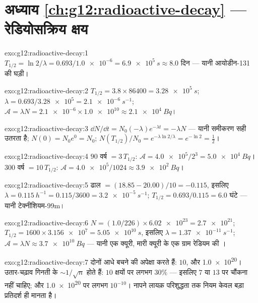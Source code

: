 \section*{अध्याय \ref{ch:g12:radioactive-decay} --- रेडियोसक्रिय क्षय}

\begin{solution}{exo:g12:radioactive-decay:1}
$T_{1/2} = \ln 2/\lambda = 0.693/\num{1.0e-6} = \qty{6.9e5}{s}
\approx 8.0$ दिन --- यानी आयोडीन-131 की घड़ी।
\end{solution}

\begin{solution}{exo:g12:radioactive-decay:2}
$T_{1/2} = 3.8 \times \num{86400} = \qty{3.28e5}{s}$; $\lambda = 0.693/\num{3.28e5} = \qty{2.1e-6}{s^{-1}}$; $\mathcal A = \lambda N = \num{2.1e-6} \times \num{1.0e10} \approx
\qty{2.1e4}{Bq}$।
\end{solution}

\begin{solution}{exo:g12:radioactive-decay:3}
$\dd N/\dd t = N_0(-\lambda)e^{-\lambda t} = -\lambda N$ --- यानी समीकरण सही उतरता है; $N(0) = N_0 e^0 = N_0$; $N(T_{1/2})/N_0 = e^{-\lambda \ln 2/\lambda} = e^{-\ln 2} =
\tfrac12$।
\end{solution}

\begin{solution}{exo:g12:radioactive-decay:4}
$90$ वर्ष $= 3\,T_{1/2}$: $\mathcal A = \num{4.0e5}/2^3 =
\qty{5.0e4}{Bq}$। $300$ वर्ष $= 10\,T_{1/2}$: $\mathcal A = \num{4.0e5}/1024 \approx \qty{3.9e2}{Bq}$।
\end{solution}

\begin{solution}{exo:g12:radioactive-decay:5}
ढाल $= (18.85 - 20.00)/10 = -0.115$, इसलिए $\lambda = \qty{0.115}{h^{-1}} = 0.115/3600 = \qty{3.2e-5}{s^{-1}}$; $T_{1/2} = 0.693/0.115 = 6.0$ घंटे --- यानी टेक्नीशियम-99m।
\end{solution}

\begin{solution}{exo:g12:radioactive-decay:6}
$N = (1.0/226) \times \num{6.02e23} = \num{2.7e21}$; $T_{1/2} = 1600 \times \num{3.156e7} = \qty{5.05e10}{s}$, इसलिए $\lambda = \qty{1.37e-11}{s^{-1}}$; $\mathcal A = \lambda N \approx \qty{3.7e10}{Bq}$ --- यानी एक क्यूरी, मारी क्यूरी के एक
ग्राम रेडियम की ।
\end{solution}

\begin{solution}{exo:g12:radioactive-decay:7}
दोनों आधे बचने की अपेक्षा करते हैं: $10$, और \num{1.0e20}। उतार-चढ़ाव गिनती के
$\sim 1/\sqrt{n}$ होते हैं: $10$ क्षयों पर लगभग $30\%$ --- इसलिए $7$ या $13$ पर
चौंकना नहीं चाहिए; और \num{1.0e20} पर लगभग $10^{-10}$। नापने लायक़ परिशुद्धता तक नियम
केवल बड़ा प्रतिदर्श ही मानता है।
\end{solution}

